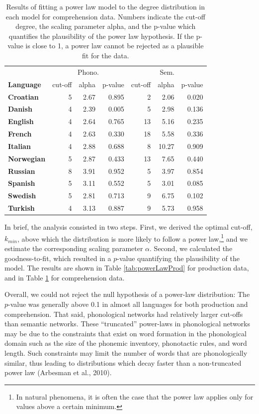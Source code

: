 \documentclass[english,,man,floatsintext]{apa6}
\let\rmarkdownfootnote\footnote%
\def\footnote{\protect\rmarkdownfootnote}
\begin{document}
\begin{table}

\caption{\label{tab:powerLawComp}Results of fitting a power law model to the degree distribution in each model for comprehension data. Numbers indicate the cut-off degree, the scaling parameter alpha, and the p-value which quantifies the plausibility of the power law hypothesis. If the p-value is close to 1, a power law cannot be rejected as a plausible fit for the data.}
\centering
\begin{tabular}[t]{>{\bfseries}lrrrrrr}
\toprule
\multicolumn{1}{c}{} & \multicolumn{3}{c}{Phono.} & \multicolumn{3}{c}{Sem.} \\
\cmidrule(l{3pt}r{3pt}){2-4} \cmidrule(l{3pt}r{3pt}){5-7}
Language & cut-off & alpha & p-value & cut-off & alpha & p-value\\
\midrule
Croatian & 5 & 2.67 & 0.895 & 2 & 2.06 & 0.020\\
Danish & 4 & 2.39 & 0.005 & 5 & 2.98 & 0.136\\
English & 4 & 2.64 & 0.765 & 13 & 5.16 & 0.235\\
French & 4 & 2.63 & 0.330 & 18 & 5.58 & 0.336\\
Italian & 4 & 2.88 & 0.688 & 8 & 10.27 & 0.909\\
Norwegian & 5 & 2.87 & 0.433 & 13 & 7.65 & 0.440\\
Russian & 8 & 3.91 & 0.952 & 5 & 3.97 & 0.854\\
Spanish & 5 & 3.11 & 0.552 & 5 & 3.01 & 0.085\\
Swedish & 5 & 2.81 & 0.713 & 9 & 6.75 & 0.102\\
Turkish & 4 & 3.13 & 0.887 & 9 & 5.73 & 0.958\\
\bottomrule
\end{tabular}
\end{table}

In brief, the analysis consisted in two steps. First, we derived the optimal cut-off, \(k_{min}\), above which the distribution is more likely to follow a power law,\footnote{In natural phenomena, it is often the case that the power law applies only for values above a certain minimum.} and we estimate the corresponding scaling parameter \(\alpha\). Second, we calculated the goodness-to-fit, which resulted in a \(p\)-value quantifying the plausibility of the model. The results are shown in Table \ref{tab:powerLawProd} for production data, and in Table \ref{tab:powerLawComp} for comprehension data.

Overall, we could not reject the null hypothesis of a power-law distribution: The \(p\)-value was generally above 0.1 in almost all languages for both production and comprehension. That said, phonological networks had relatively larger cut-offs than semantic networks. These \enquote{truncated} power-laws in phonological networks may be due to the constraints that exist on word formation in the phonological domain such as the size of the phonemic inventory, phonotactic rules, and word length. Such constraints may limit the number of words that are phonologically similar, thus leading to distributions which decay faster than a non-truncated power law (Arbesman et al., 2010).
\end{document}

